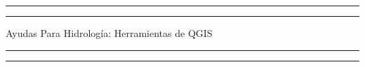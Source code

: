\documentclass[12pt,hidelinks]{article}
\begin{document}
\renewcommand\tablename{Tabla}
\renewcommand\listtablename{Índice de Tablas}

\begin{titlepage}
	\centering %
	\scshape %
	\vspace*{1.5\baselineskip} %
\begin{figure}
        \centering
	\end{figure}
	\vspace{2\baselineskip} 
	\rule{13cm}{1.6pt}\vspace*{-\baselineskip}\vspace*{2pt} %
	\rule{13cm}{0.4pt} %
	
		\vspace{0.8\baselineskip} %
	{	\Huge Ayudas Para Hidrología: Herramientas de QGIS\\ 
			\vspace{4mm}
		}
		\vspace{0.8\baselineskip} %
	\rule{13cm}{0.4pt}\vspace*{-\baselineskip}\vspace{3.2pt} %
	\rule{13cm}{1.6pt} %
	

\end{titlepage}
\end{document}
